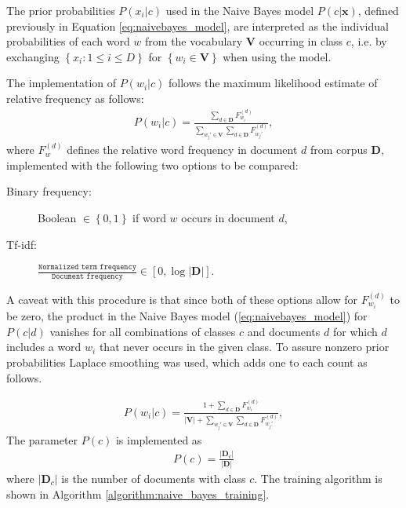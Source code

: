 
The prior probabilities $P(x_i\vert c)$ used in the Naive Bayes model $P(c\vert\mathbf{x})$, defined previously in Equation \ref{eq:naivebayes_model}, are interpreted as the individual probabilities of each word $w$ from the vocabulary $\mathbf{V}$ occurring in class $c$, i.e. by exchanging $\left\{x_i : 1 \le i \le D\right\}$ for $\left\{w_i \in \mathbf{V}\right\}$ when using the model.

The implementation of $P(w_i\vert c)$ follows the maximum likelihood estimate of relative frequency as follows:
\begin{align}
P(w_i\vert c) =
\frac
	{
		\sum_{d \in \mathbf{D}} F_{w_i}^{(d)}
	}
	{
		\sum_{w_j' \in \mathbf{V}} \sum_{d \in \mathbf{D}}  F_{w_j'}^{(d)}
	},
\end{align}
where $F_w^{(d)}$ defines the relative word frequency in document $d$ from corpus $\mathbf{D}$, implemented with the following two options to be compared:
\begin{description}
  \item[Binary frequency:] Boolean $\in \left\{0,1\right\}$ if word $w$ occurs in document $d$,
  \item[Tf-idf:] $\frac{\texttt{Normalized term frequency}}{\texttt{Document frequency}} \in \left[0, \log \left\vert \mathbf{D}\right\vert\right]$.
\end{description}
A caveat with this procedure is that since both of these options allow for $F_{w_i}^{(d)}$ to be zero, the product in the Naive Bayes model (\ref{eq:naivebayes_model}) for $P(c\vert d)$ vanishes for all combinations of classes $c$ and documents $d$ for which $d$ includes a word $w_i$ that never occurs in the given class. To assure nonzero prior probabilities Laplace smoothing was used, which adds one to each count as follows. \citep{nb_ref}

\begin{align}
P(w_i\vert c) =
\frac
	{
		1 + \sum_{d \in \mathbf{D}} F_{w_i}^{(d)}
	}
	{
		\left\vert\mathbf{V}\right\vert + \sum_{w_j' \in \mathbf{V}} \sum_{d \in \mathbf{D}} F_{w_j'}^{(d)}
	},
\end{align}
The parameter $P(c)$ is implemented as
\begin{align}
P(c) = \frac{\left\vert\mathbf{D}_c\right\vert}{\left\vert\mathbf{D}\right\vert}
\end{align}
where $\left\vert\mathbf{D}_c\right\vert$ is the number of documents with class $c$. The training algorithm is shown in Algorithm \ref{algorithm:naive_bayes_training}.

